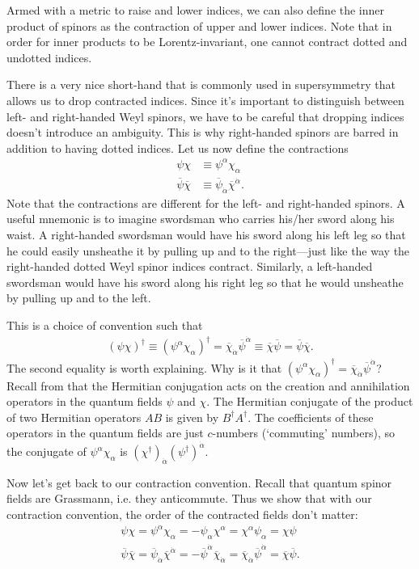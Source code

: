Armed with a metric to raise and lower indices, we can also define the inner product of spinors as the contraction of upper and lower indices. Note that in order for inner products to be Lorentz-invariant, one cannot contract dotted and undotted indices. 

There is a very nice short-hand that is commonly used in supersymmetry that allows us to drop contracted indices. Since it's important to distinguish between left- and right-handed Weyl spinors, we have to be careful that dropping indices doesn't introduce an ambiguity. This is why right-handed spinors are barred in addition to having dotted indices. Let us now define the contractions
\begin{align}
    \psi\chi &\equiv \psi^\alpha\chi_\alpha\label{eq:susyalg:undotted}\\
    \overline\psi\overline\chi &\equiv \overline\psi_{\dot\alpha}\overline\chi^{\dot\alpha}\label{eq:susyalg:dot}.
\end{align}
Note that the contractions are different for the left- and right-handed spinors. A useful mnemonic is to imagine swordsman who carries his/her sword along his waist. A right-handed swordsman would have his sword along his left leg so that he could easily unsheathe it by pulling up and to the right---just like the way the right-handed dotted Weyl spinor indices contract. Similarly, a left-handed swordsman would have his sword along his right leg so that he would unsheathe by pulling up and to the left.

This is a choice of convention such that
\begin{align}
    (\psi\chi)^\dag \equiv (\psi^\alpha\chi_\alpha)^\dag = \overline\chi_{\dot\alpha}\overline\psi^{\dot\alpha} \equiv \overline\chi\overline\psi = \overline\psi\overline\chi.
\end{align}
The second equality is worth explaining. Why is it that $(\psi^\alpha\chi_\alpha)^\dag = \overline\chi_{\dot\alpha}\overline\psi^{\dot\alpha}$? Recall from that the Hermitian conjugation acts on the creation and annihilation operators in the quantum fields $\psi$ and $\chi$. The Hermitian conjugate of the product of two Hermitian operators $AB$ is given by $B^\dag A^\dag$. The coefficients of these operators in the quantum fields are just $c$-numbers (`commuting' numbers), so the conjugate of $\psi^\alpha\chi_\alpha$ is $\left(\chi^\dag\right)_{\dot\alpha}\left(\psi^\dag\right)^{\dot\alpha}$.

Now let's get back to our contraction convention. Recall that quantum spinor fields are Grassmann, i.e. they anticommute. Thus we show that with our contraction convention, the order of the contracted fields don't matter:
\begin{align}
    \psi\chi = \psi^\alpha\chi_\alpha = -\psi_\alpha\chi^\alpha = \chi^\alpha\psi_\alpha = \chi\psi\label{eq:SUSYalg:contractions}\\
    \overline\psi\overline\chi = \overline\psi_{\dot\alpha}\overline\chi^{\dot\alpha}= -\overline\psi^{\dot\alpha}\overline\chi_{\dot\alpha} = \overline\chi_{\dot\alpha}\overline\psi^{\dot\alpha}=\overline\chi\overline\psi.\label{eq:SUSYalg:overlinecontractions}
\end{align} 

